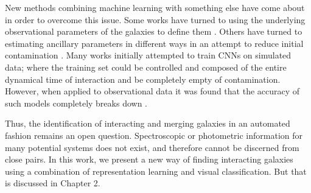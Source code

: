 New methods combining machine learning with something else have come about in order to overcome this issue. Some works have turned to using the underlying observational parameters of the galaxies to define them \citep{LDA paper}. Others have turned to estimating ancillary parameters in different ways in an attempt to reduce initial contamination \citep{Papers with estimating redshifts}. Many works initially attempted to train CNNs on simulated data; where the training set could be controlled and composed of the entire dynamical time of interaction and be completely empty of contamination. However, when applied to observational data it was found that the accuracy of such models completely breaks down \citep{Papers on simulated to observed data in neural networks}.

Thus, the identification of interacting and merging galaxies in an automated fashion remains an open question. Spectroscopic or photometric information for many potential systems does not exist, and therefore cannot be discerned from close pairs. In this work, we present a new way of finding interacting galaxies using a combination of representation learning \citep{Representation learning} and visual classification. But that is discussed in Chapter 2.